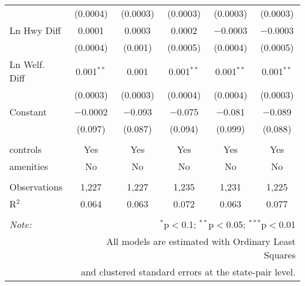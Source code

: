 \begin{table}[!htbp]
\begin{tabular}{@{\extracolsep{5pt}}lccccc}
  & (0.0004) & (0.0003) & (0.0003) & (0.0003) & (0.0003) \\ 
  Ln Hwy Diff & 0.0001 & 0.0003 & 0.0002 & $-$0.0003 & $-$0.0003 \\ 
  & (0.0004) & (0.001) & (0.0005) & (0.0004) & (0.0005) \\ 
  Ln Welf. Diff & 0.001$^{**}$ & 0.001 & 0.001$^{**}$ & 0.001$^{**}$ & 0.001$^{**}$ \\ 
  & (0.0003) & (0.0003) & (0.0004) & (0.0004) & (0.0003) \\ 
  Constant & $-$0.0002 & $-$0.093 & $-$0.075 & $-$0.081 & $-$0.089 \\ 
  & (0.097) & (0.087) & (0.094) & (0.099) & (0.088) \\ 
 \hline \\[-1.8ex] 
controls & Yes & Yes & Yes & Yes & Yes \\ 
amenities & No & No & No & No & No \\ 
\hline \\[-1.8ex] 
Observations & 1,227 & 1,227 & 1,235 & 1,231 & 1,225 \\ 
R$^{2}$ & 0.064 & 0.063 & 0.072 & 0.063 & 0.077 \\ 
\hline 
\hline \\[-1.8ex] 
\textit{Note:}  & \multicolumn{5}{r}{$^{*}$p$<$0.1; $^{**}$p$<$0.05; $^{***}$p$<$0.01} \\ 
 & \multicolumn{5}{r}{All models are estimated with Ordinary Least Squares} \\ 
 & \multicolumn{5}{r}{and clustered standard errors at the state-pair level.} \\ 
\end{tabular} 
\end{table} 
